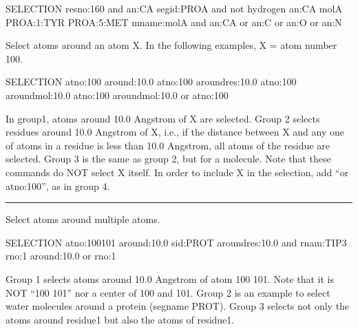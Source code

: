\documentclass[a4paper,11pt,oneside,english]{sphinxmanual}
\begin{document}
\begin{sphinxVerbatim}[commandchars=\\\{\}]
\PYG{o}{[}SELECTION\PYG{o}{]}
      resno:1\PYGZhy{}60 and an:CA
      segid:PROA and not hydrogen  an:CA
  molA PROA:1:TYR PROA:5:MET
      mname:molA and an:CA or an:C or an:O or an:N
\end{sphinxVerbatim}

Select atoms around an atom X. In the following examples, X = atom number 100.

\begin{sphinxVerbatim}[commandchars=\\\{\}]
\PYG{o}{[}SELECTION\PYG{o}{]}
      atno:100 around:10.0
      atno:100 around\PYGZus{}res:10.0
      atno:100 around\PYGZus{}mol:10.0
      atno:100 around\PYGZus{}mol:10.0 or atno:100
\end{sphinxVerbatim}

In group1, atoms around 10.0 Angstrom of X are selected. Group 2 selects residues around
10.0 Angstrom of X, i.e., if the distance between X and any one of atoms in a residue is
less than 10.0 Angstrom, all atoms of the residue are selected. Group 3 is the same as
group 2, but for a molecule. Note that these commands do NOT select X itself.
In order to include X in the selection, add “or atno:100”, as in group 4.


\bigskip\hrule\bigskip


Select atoms around multiple atoms.

\begin{sphinxVerbatim}[commandchars=\\\{\}]
\PYG{o}{[}SELECTION\PYG{o}{]}
      atno:100\PYGZhy{}101 around:10.0
      sid:PROT around\PYGZus{}res:10.0 and rnam:TIP3
      rno:1 around:10.0 or rno:1
\end{sphinxVerbatim}

Group 1 selects atoms around 10.0 Angstrom of atom 100  101. Note that it is NOT
“100  101” nor a center of 100 and 101. Group 2 is an example to select water
molecules around a protein (segname PROT). Group 3 selects not only the atoms around
residue1 but also the atoms of residue1.
\end{document}
